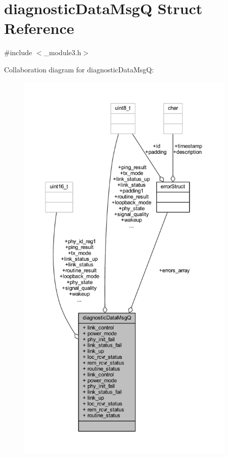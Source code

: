 \hypertarget{structdiagnostic_data_msg_q}{}\section{diagnostic\+Data\+MsgQ Struct Reference}
\label{structdiagnostic_data_msg_q}


{\ttfamily \#include $<$\+\_\+module3.\+h$>$}



Collaboration diagram for diagnostic\+Data\+MsgQ\+:
\nopagebreak
\begin{figure}[H]
\begin{center}
\leavevmode
\includegraphics[height=550pt]{structdiagnostic_data_msg_q__coll__graph}
\end{center}
\end{figure}
